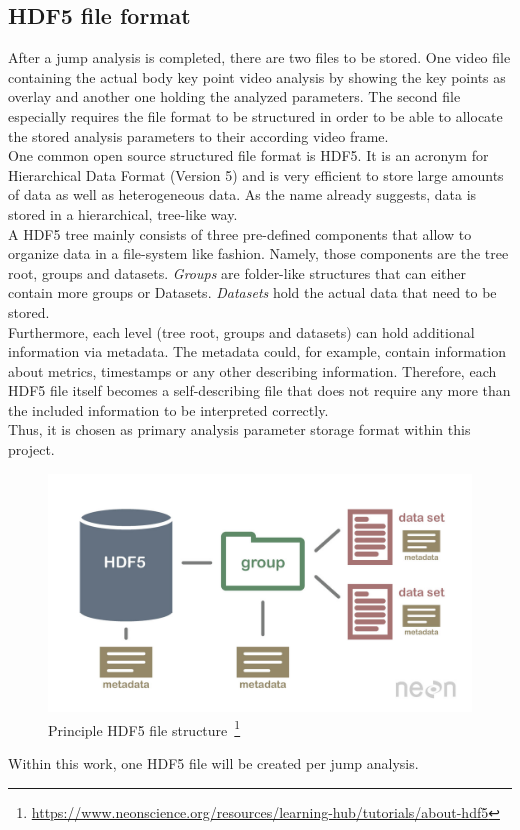 \subsection{HDF5 file format}\label{subsec:2_hdf5}
After a jump analysis is completed, there are two files to be stored.
One video file containing the actual body key point video analysis by showing
the key points as overlay and another one holding the analyzed parameters.
The second file especially requires the file format to be structured in order
to be able to allocate the stored analysis parameters to their according video
frame.\\
One common open source structured file format is HDF5\cite{The_HDF_Group_Hierarchical_Data_Format}.
It is an acronym for Hierarchical Data Format (Version 5) and is very efficient 
to store large amounts of data as well as heterogeneous data.
As the name already suggests, data is stored in a hierarchical, tree-like way.\\
A HDF5 tree mainly consists of three pre-defined components that allow to 
organize data in a file-system like fashion.
Namely, those components are the tree root, groups and datasets.
\textit{Groups} are folder-like structures that can either contain more groups 
or Datasets.
\textit{Datasets} hold the actual data that need to be stored.\\
Furthermore, each level (tree root, groups and datasets) can hold additional 
information via metadata.
The metadata could, for example, contain information about metrics, timestamps or 
any other describing information.
Therefore, each HDF5 file itself becomes a self-describing file that does not
require any more than the included information to be interpreted correctly.\\
Thus, it is chosen as primary analysis parameter storage format within this
project.
\begin{figure}[!h]
    \centering
    \includegraphics[scale=0.24]{figures/hdf5_general_structure.jpg}
    \caption[HDF5 file structure]
    {Principle HDF5 file structure~\footnote{
        \url{https://www.neonscience.org/resources/learning-hub/tutorials/about-hdf5}}}
    \label{fig:2_principle_hdf5_structure}
\end{figure}
\FloatBarrier
\noindent Within this work, one HDF5 file will be created per jump analysis.

